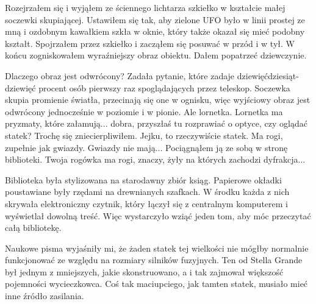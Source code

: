 Rozejrzałem się i wyjąłem ze ściennego lichtarza szkiełko w kształcie małej soczewki skupiającej.
Ustawiłem się tak, aby zielone UFO było w linii prostej ze mną i ozdobnym kawałkiem szkła w oknie, który także okazał się mieć podobny kształt.
Spojrzałem przez szkiełko i zacząłem się posuwać w przód i w tył. W końcu zogniskowałem wyraźniejszy obraz obiektu.
Dałem popatrzeć dziewczynie.

\begin{dialogue}
	\ds{} Dlaczego obraz jest odwrócony? \dm{} Zadała pytanie, które zadaje dziewięćdziesiąt-dziewięć procent osób pierwszy raz spoglądających przez teleskop.
	\ds{} Soczewka skupia promienie światła, przecinają się one w ognisku, więc wyjściowy obraz jest odwrócony jednocześnie w poziomie i w pionie.
	\ds{} Ale lornetka.
	\ds{} Lornetka ma pryzmaty, które załamują... dobra, przyszłaś tu rozprawiać o optyce, czy oglądać statek? \dm{} Trochę się zniecierpliwiłem.
	\ds{} Jejku, to rzeczywiście statek. Ma rogi, zupełnie jak gwiazdy.
	\ds{} Gwiazdy nie mają... \dm{} Pociągnąłem ją ze sobą w stronę biblioteki. \dm{} Twoja rogówka ma rogi, znaczy, żyły na których zachodzi dyfrakcja...
\end{dialogue}

Biblioteka była stylizowana na starodawny zbiór ksiąg.
Papierowe okładki poustawiane były rzędami na drewnianych szafkach.
W środku każda z nich skrywała elektroniczny czytnik, który łączył się z centralnym komputerem i wyświetlał dowolną treść.
Więc wystarczyło wziąć jeden tom, aby móc przeczytać całą bibliotekę.

Naukowe pisma wyjaśniły mi, że żaden statek tej wielkości nie mógłby normalnie funkcjonować ze względu na rozmiary silników fuzyjnych.
Ten od Stella Grande był jednym z mniejszych, jakie skonstruowano, a i tak zajmował większość pojemności wycieczkowca.
Coś tak maciupciego, jak tamten statek, musiało mieć inne źródło zasilania.

